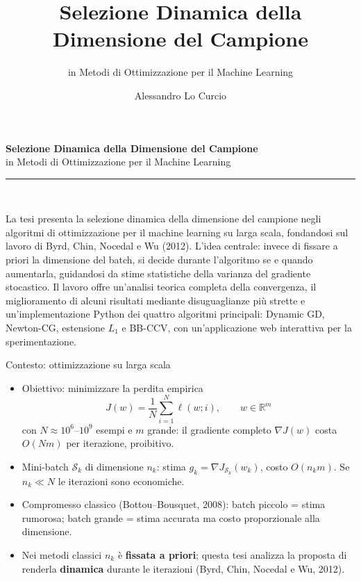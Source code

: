 \documentclass[aspectratio=169,11pt]{beamer}
\title{Selezione Dinamica della Dimensione del Campione}
\subtitle{in Metodi di Ottimizzazione per il Machine Learning}
\author{Alessandro Lo Curcio}
\begin{document}
\begin{frame}
  \begin{center}
    {\LARGE\bfseries\color{acc} Selezione Dinamica della Dimensione del Campione}\\[0.3cm]
    {\large in Metodi di Ottimizzazione per il Machine Learning}\\[0.6cm]
    \textcolor{acc2}{\rule{0.7\textwidth}{0.8pt}}\\[0.5cm]
  \end{center}
  \small
  La tesi presenta la selezione dinamica della dimensione del campione
  negli algoritmi di ottimizzazione per il machine learning su larga scala,
  fondandosi sul lavoro di Byrd, Chin, Nocedal e Wu (2012). L'idea centrale:
  invece di fissare a priori la dimensione del batch, si decide durante
  l'algoritmo se e quando aumentarla, guidandosi da stime statistiche della
  varianza del gradiente stocastico. Il lavoro offre un'analisi teorica
  completa della convergenza, il miglioramento di alcuni risultati mediante
  disuguaglianze più strette e un'implementazione Python dei quattro algoritmi
  principali: Dynamic GD, Newton-CG, estensione $L_1$ e BB-CCV, con
  un'applicazione web interattiva per la sperimentazione.
\end{frame}

\begin{frame}{Contesto: ottimizzazione su larga scala}
  \begin{itemize}
    \item Obiettivo: minimizzare la perdita empirica
      \[
        J(w) = \frac{1}{N}\sum_{i=1}^{N}\ell(w;i),
        \qquad w\in\mathbb{R}^m
      \]
      con $N \approx 10^6$--$10^9$ esempi e $m$ grande: il gradiente completo
      $\nabla J(w)$ costa $O(Nm)$ per iterazione, proibitivo.
    \item Mini-batch $\mathcal{S}_k$ di dimensione $n_k$: stima
      $g_k=\nabla J_{\mathcal{S}_k}(w_k)$, costo $O(n_k m)$.
      Se $n_k\ll N$ le iterazioni sono economiche.
    \item Compromesso classico (Bottou--Bousquet, 2008):
      batch piccolo = stima rumorosa; batch grande = stima accurata ma costo
      proporzionale alla dimensione.
    \item Nei metodi classici $n_k$ è \textbf{fissata a priori}; questa tesi
      analizza la proposta di renderla \textbf{dinamica} durante le
      iterazioni (Byrd, Chin, Nocedal e Wu, 2012).
  \end{itemize}
\end{frame}
\end{document}
